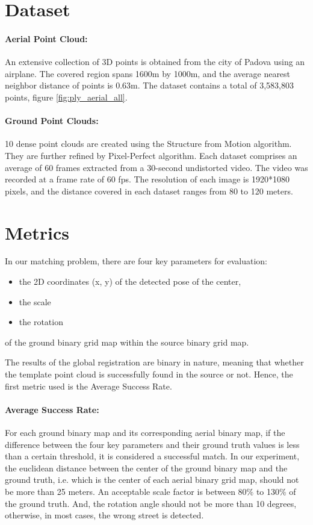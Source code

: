 \documentclass[11pt]{article}
\begin{document}
    \section{Dataset}
    \paragraph{Aerial Point Cloud:} An extensive collection of 3D points is obtained from the city of Padova
    using an airplane. The covered region spans 1600m by 1000m, and the average nearest neighbor distance
    of points is 0.63m. The dataset contains a total of 3,583,803 points, figure \ref{fig:ply_aerial_all}.
    \paragraph{Ground Point Clouds:} 10 dense point clouds are created using the Structure from Motion algorithm.
    They are further refined by Pixel-Perfect algorithm. Each dataset comprises an average of
    60 frames extracted from a 30-second undistorted video. The video was recorded at a frame rate of 60 fps.
    The resolution of each image is 1920*1080 pixels, and the distance covered in each dataset ranges from 80 to 120 meters.

    \section{Metrics}
    In our matching problem, there are four key parameters for evaluation:
    \begin{itemize}
        \item the 2D coordinates (x, y) of the detected pose of the center,
        \item the scale
        \item the rotation
    \end{itemize}
    of the ground binary grid map within the source binary grid map.

    The results of the global registration are binary in nature, meaning that whether the template point cloud
    is successfully found in the source or not. Hence, the first metric used is the Average Success Rate.
    \paragraph{Average Success Rate:} For each ground binary map and its corresponding aerial binary map, if the difference
    between the four key parameters and their ground truth values is less than a certain threshold, it is considered
    a successful match. In our experiment, the euclidean distance between the center of the ground binary map and the ground
    truth, i.e. which is the center of each aerial binary grid map, should not be more than 25 meters. An acceptable
    scale factor is between 80\% to 130\% of the ground truth. And, the rotation angle should not be more than 10
    degrees, otherwise, in most cases, the wrong street is detected.
\end{document}
